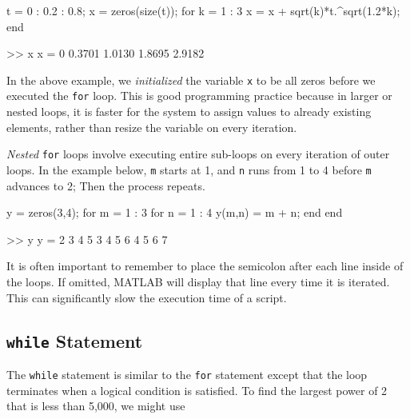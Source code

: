 \begin{codex}
t = 0 : 0.2 : 0.8;
x = zeros(size(t));
for k = 1 : 3
    x = x + sqrt(k)*t.^sqrt(1.2*k);
end

>>  x
x =
    0   0.3701  1.0130  1.8695  2.9182
\end{codex}
In the above example, we \textit{initialized} the variable \verb=x= to be all zeros before we executed the \verb=for= loop.  This is good programming practice because in larger or nested loops, it is faster for the system to assign values to already existing elements, rather than resize the variable on every iteration.
\par
\textit{Nested} \verb=for= loops involve executing entire sub-loops on every iteration of outer loops.  In the example below, \verb=m= starts at 1, and \verb=n= runs from 1 to 4 before \verb=m= advances to 2; Then the process repeats.

\begin{codex}
y = zeros(3,4);
for m = 1 : 3
    for n = 1 : 4
        y(m,n) = m + n;
    end
end

>>  y
y =
    2   3   4   5
    3   4   5   6
    4   5   6   7
\end{codex}
It is often important to remember to place the semicolon after each line inside of the loops.  If omitted, MATLAB will display that line every time it is iterated.  This can significantly slow the execution time of a script.

\subsection{\texttt{while} Statement}
The \verb=while= statement is similar to the \verb=for= statement except that the loop terminates when a logical condition is satisfied.  To find the largest power of 2 that is less than 5,000, we might use

